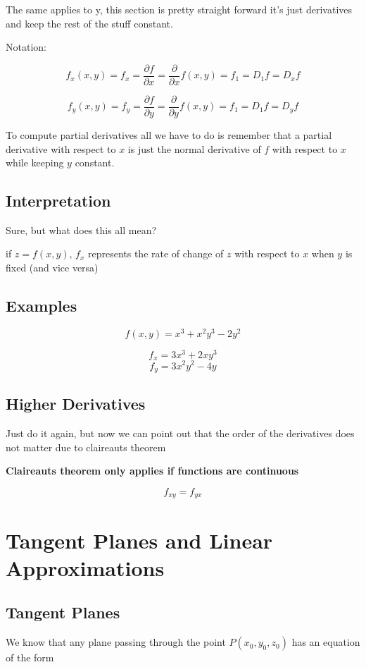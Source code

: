 \documentclass{article}
\begin{document}
The same applies to y, this section is pretty straight forward it's just derivatives and keep the rest of the stuff constant.

Notation:

$$f_x(x,y) = f_x = \frac{\partial f}{\partial x} = \frac{\partial}{\partial x}f(x,y) = f_1 = D_1f = D_xf$$

$$f_y(x,y) = f_y = \frac{\partial f}{\partial y} = \frac{\partial}{\partial y}f(x,y) = f_1 = D_1f = D_yf$$

To compute partial derivatives all we have to do is remember that a partial derivative with respect to $x$ is just the normal derivative of $f$ with respect to $x$ while keeping $y$ constant.

\subsection{Interpretation}

Sure, but what does this all mean?

if $z = f(x,y)$, $f_x$ represents the rate of change of $z$ with respect to $x$ when $y$ is fixed (and vice versa) 

\subsection{Examples}

$$f(x,y) = x^3 + x^2y^3 -2y^2$$


$$f_x = 3x^3 + 2xy^3$$
$$f_y = 3x^2y^2 - 4y$$

\subsection{Higher Derivatives}

Just do it again, but now we can point out that the order of the derivatives does not matter due to claireauts theorem

\textbf{Claireauts theorem only applies if functions are continuous}

$$f_{xy} = f_{yx}$$

\newpage
\section{Tangent Planes and Linear Approximations}


\subsection{Tangent Planes}
We know that any plane passing through the point $P(x_0,y_0,z_0)$ has an equation of the form 
\end{document}
